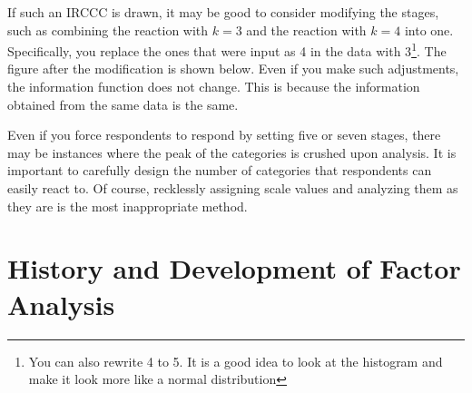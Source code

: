 \documentclass{ltjsbook}
\begin{document}
If such an IRCCC is drawn, it may be good to consider modifying the stages, such as combining the reaction with $k=3$ and the reaction with $k=4$ into one. Specifically, you replace the ones that were input as 4 in the data with 3\footnote{You can also rewrite 4 to 5. It is a good idea to look at the histogram and make it look more like a normal distribution}. The figure after the modification is shown below. Even if you make such adjustments, the information function does not change. This is because the information obtained from the same data is the same.

Even if you force respondents to respond by setting five or seven stages, there may be instances where the peak of the categories is crushed upon analysis. It is important to carefully design the number of categories that respondents can easily react to. Of course, recklessly assigning scale values and analyzing them as they are is the most inappropriate method.




\section{History and Development of Factor Analysis}
\end{document}
